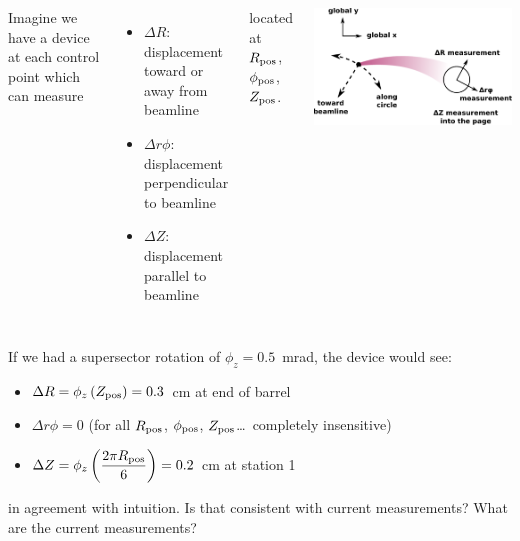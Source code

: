 \documentclass[compress]{beamer}
\begin{document}
\begin{frame}
\vspace{0.25 cm}
\begin{columns}
Imagine we have a device at each control point which can measure
\begin{itemize}
\item $\Delta R$: displacement toward or away from beamline
\item $\Delta r\phi$: displacement perpendicular to beamline
\item $\Delta Z$: displacement parallel to beamline
\end{itemize}
located at $R_{\mbox{\scriptsize pos}}$, $\phi_{\mbox{\scriptsize pos}}$, $Z_{\mbox{\scriptsize pos}}$.

\includegraphics[width=\linewidth]{measurement.pdf}
\end{columns}

\vspace{0.25 cm}
If we had a supersector rotation of $\phi_z = 0.5$~mrad, the device would see:
\begin{itemize}
\item $\displaystyle \Delta R = \phi_z \left(Z_{\mbox{\scriptsize pos}}\right) = 0.3$~cm at end of barrel
\item $\displaystyle \Delta r\phi = 0$ \hfill (for all $R_{\mbox{\scriptsize pos}}$, $\phi_{\mbox{\scriptsize pos}}$, $Z_{\mbox{\scriptsize pos}}$\ldots\ completely insensitive)
\item $\displaystyle \Delta Z = \phi_z \left(\frac{2\pi R_{\mbox{\scriptsize pos}}}{6}\right) = 0.2$~cm at station 1
\end{itemize}
in agreement with intuition.  Is that consistent with current measurements?  What are the current measurements?
\end{frame}
\end{document}
